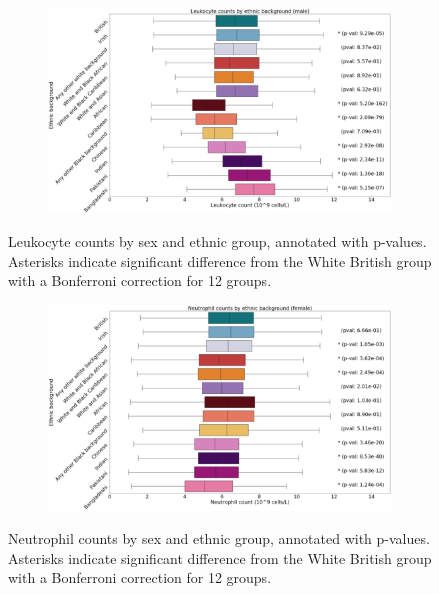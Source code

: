 \documentclass[12pt]{pnas-new}
\begin{document}
\begin{figure}
    \centering
    \begin{subfigure}{\textwidth}
    \includegraphics[width=\textwidth]{images/male_leukocyte_boxplot_annotated.pdf}
    \end{subfigure}
    \caption{Leukocyte counts by sex and ethnic group, annotated with p-values. Asterisks indicate significant difference from the White British group with a Bonferroni correction for 12 groups.}
    \label{fig:supp_box_leukocyte_m}
\end{figure}

\begin{figure}
    \centering
    \begin{subfigure}{\textwidth}
    \includegraphics[width=\textwidth]{images/female_neutrophil_boxplot_annotated.pdf}
    \end{subfigure}
    \caption{Neutrophil counts by sex and ethnic group, annotated with p-values. Asterisks indicate significant difference from the White British group with a Bonferroni correction for 12 groups.}
    \label{fig:supp_box_neutrophill_f}
\end{figure}
\end{document}
